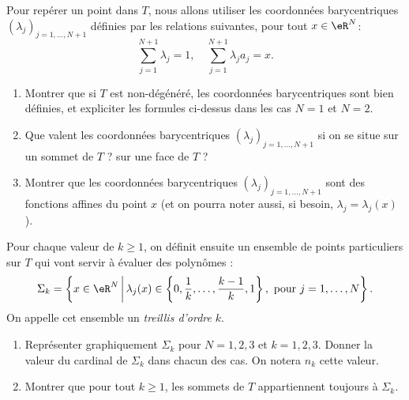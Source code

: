 \begin{exercice}\label{exoChPk_barycentrique}

Pour repérer un point dans $T$, nous allons utiliser les coordonnées barycentriques $(\lambda_j)_{j=1,\ldots,N+1}$ définies par les relations suivantes, pour tout $x\in\eR^N$:
\[
\sum_{j=1}^{N+1} \lambda_j = 1, \quad
\sum_{j=1}^{N+1} \lambda_j a_j = x.
\]

\begin{enumerate}

\item Montrer que si $T$ est non-dégénéré, les coordonnées barycentriques sont bien définies, et expliciter les formules ci-dessus dans les cas $N=1$ et $N=2$.

\item Que valent les coordonnées barycentriques $(\lambda_j)_{j=1,\ldots,N+1}$ si on se situe sur un sommet de $T$ ? sur une face de $T$ ?

\item Montrer que les coordonnées barycentriques $(\lambda_j)_{j=1,\ldots,N+1}$ sont des fonctions affines du point $x$ (et on pourra noter aussi, si besoin, $\lambda_j = \lambda_j (x)$).

\end{enumerate}

\end{exercice}

\medskip

Pour chaque valeur de $k\geq1$, on définit ensuite un ensemble de points particuliers sur $T$ qui vont servir à évaluer des polynômes :
\[
\Sigma_k = \left \{ x \in \eR^N \,\middle| \, \lambda_j(x) \in \left\{0,\frac{1}{k},\ldots,\frac{k-1}{k},1\right \}, \mbox{ pour } j=1,\ldots,N \right \}.
\]
On appelle cet ensemble un \emph{treillis d'ordre} $k$.

\medskip

\begin{exercice}\label{exoChPk_treillis}

\begin{enumerate}
\item Représenter graphiquement $\Sigma_k$ pour $N=1,2,3$ et $k=1,2,3$. Donner la valeur du cardinal de $\Sigma_k$ dans chacun des cas. On notera $n_k$ cette valeur.

\item Montrer que pour tout $k\geq 1$, les sommets de $T$ appartiennent toujours à $\Sigma_k$.
\end{enumerate}

\end{exercice}

